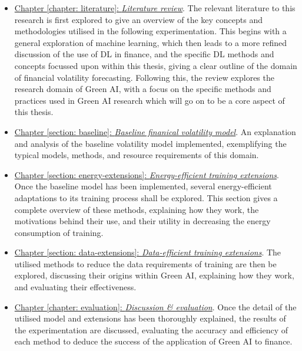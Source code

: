 \documentclass[a4paper, 11pt]{report}
\begin{document}
    \begin{itemize}
        \item \underline{Chapter \ref{chapter: literature}: \emph{Literature review}}. The relevant literature to this research is first explored to give an overview of the key concepts and methodologies utilised in the following experimentation. This begins with a general exploration of machine learning, which then leads to a more refined discussion of the use of DL in finance, and the specific DL methods and concepts focussed upon within this thesis, giving a clear outline of the domain of financial volatility forecasting. Following this, the review explores the research domain of Green AI, with a focus on the specific methods and practices used in Green AI research which will go on to be a core aspect of this thesis.
        
        \item \underline{Chapter \ref{section: baseline}: \emph{Baseline finanical volatility model}}. An explanation and analysis of the baseline volatility model implemented, exemplifying the typical models, methods, and resource requirements of this domain.

        \item \underline{Chapter \ref{section: energy-extensions}: \emph{Energy-efficient training extensions}}. Once the baseline model has been implemented, several energy-efficient adaptations to its training process shall be explored. This section gives a complete overview of these methods, explaining how they work, the motivations behind their use, and their utility in decreasing the energy consumption of training.
        
        \item \underline{Chapter \ref{section: data-extensions}: \emph{Data-efficient training extensions}}. The utilised methods to reduce the data requirements of training are then be explored, discussing their origins within Green AI, explaining how they work, and evaluating their effectiveness.
        
        \item \underline{Chapter \ref{chapter: evaluation}: \emph{Discussion \& evaluation}}. Once the detail of the utilised model and extensions has been thoroughly explained, the results of the experimentation are discussed, evaluating the accuracy and efficiency of each method to deduce the success of the application of Green AI to finance.
    \end{itemize}
\end{document}
